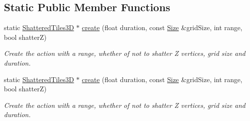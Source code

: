 \subsection*{Static Public Member Functions}
\begin{DoxyCompactItemize}
\item 
static \hyperlink{classShatteredTiles3D}{Shattered\+Tiles3D} $\ast$ \hyperlink{classShatteredTiles3D_ab1298dfa0cf5d8bf89143c9189487e72}{create} (float duration, const \hyperlink{classSize}{Size} \&grid\+Size, int range, bool shatterZ)
\begin{DoxyCompactList}\small\item\em Create the action with a range, whether of not to shatter Z vertices, grid size and duration. \end{DoxyCompactList}\item 
static \hyperlink{classShatteredTiles3D}{Shattered\+Tiles3D} $\ast$ \hyperlink{classShatteredTiles3D_aea9333d3924ab0443ce926c830c5df4d}{create} (float duration, const \hyperlink{classSize}{Size} \&grid\+Size, int range, bool shatterZ)
\begin{DoxyCompactList}\small\item\em Create the action with a range, whether of not to shatter Z vertices, grid size and duration. \end{DoxyCompactList}\end{DoxyCompactItemize}
